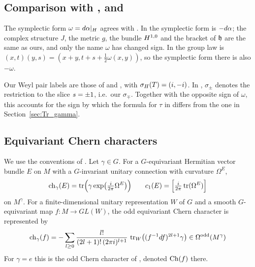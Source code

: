 \documentclass[11pt]{amsart}
\theoremstyle{plain}
\theoremstyle{definition}
\theoremstyle{remark}
\begin{document}
\subsection*{Comparison with \cite{GvE20}, \cite{GvE25} and \cite{GvE26}}

The symplectic form $\omega=d\alpha|_H$ agrees with \cite{GvE26}.
In \cite{GvE20} the symplectic form is $-d\alpha$; the complex structure $J$, the metric $g$, the bundle $H^{1,0}$ and the bracket of $\mathfrak{h}$ are the same as ours, and only the name $\omega$ has changed sign.
In \cite{GvE25} the group law is $(x,t)(y,s)=(x+y,t+s+\frac12\omega(x,y))$, so the symplectic form there is also $-\omega$.

Our Weyl pair labels are those of \cite{GvE20} and \cite[Section~4.2]{GvE26}, with $\sigma_H(T)=(i,-i)$.
In \cite{GvE25}, $\sigma_\pm$ denotes the restriction to the slice $s=\pm1$, i.e.\ our $\sigma_\mp$.
Together with the opposite sign of $\omega$, this accounts for the sign by which the formula for $\tau$ in \cite{GvE25} differs from the one in Section~\ref{sec:Tr_gamma}.

\subsection*{Equivariant Chern characters}

We use the conventions of \cite[Section~5.7]{GvE26}.
Let $\gamma\in G$.
For a $G$-equivariant Hermitian vector bundle $E$ on $M$ with a $G$-invariant unitary connection with curvature $\Omega^E$,
\[ \operatorname{ch}_\gamma(E)=\operatorname{tr}\Bigl(\gamma\exp\bigl(\tfrac{i}{2\pi}\Omega^E\bigr)\Bigr)\qquad c_1(E)=\Bigl[\tfrac{i}{2\pi}\operatorname{tr}(\Omega^E)\Bigr]\]
on $M^\gamma$.
For a finite-dimensional unitary representation $W$ of $G$ and a smooth $G$-equivariant map $f:M\to GL(W)$, the odd equivariant Chern character is represented by
\[ \operatorname{ch}_\gamma(f)=-\sum_{l\ge0}\frac{l!}{(2l+1)!\,(2\pi i)^{l+1}}\,\operatorname{tr}_W\bigl((f^{-1}df)^{2l+1}\gamma\bigr)\in\Omega^{\mathrm{odd}}(M^\gamma)\]
For $\gamma=e$ this is the odd Chern character of \cite{GvE20}, denoted $\operatorname{Ch}(f)$ there.









\end{document}
